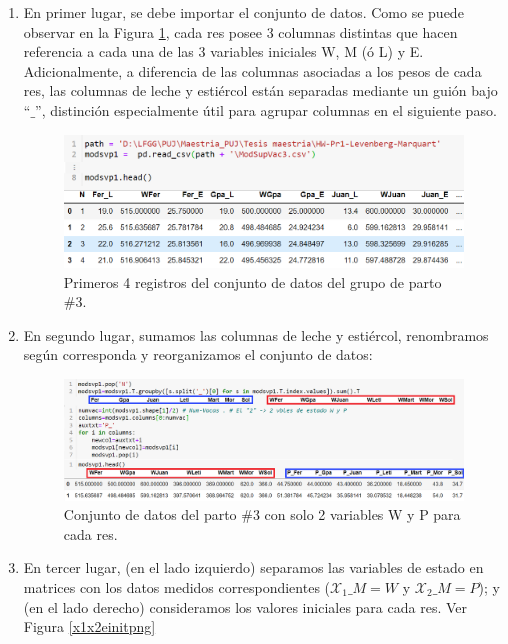 \begin{enumerate}
    \item En primer lugar, se debe importar el conjunto de datos. Como se puede observar en la Figura \ref{agrupmodpng}, cada res posee 3 columnas distintas que hacen referencia a cada una de las 3 variables iniciales W, M (ó L) y E. Adicionalmente, a diferencia de las columnas asociadas a los pesos de cada res, las columnas de leche y estiércol están separadas mediante un guión bajo ``$\_$'', distinción especialmente útil para agrupar columnas en el siguiente paso.
    
        \begin{figure}[H]
            \centering
            \includegraphics[width=\textwidth]{img/Agrupmod.png}
            \caption{Primeros 4 registros del conjunto de datos del grupo de parto \#3.}
            \label{agrupmodpng}
        \end{figure}

    \item En segundo lugar, sumamos las columnas de leche y estiércol, renombramos según corresponda y reorganizamos el conjunto de datos:

        \begin{figure}[H]
            \centering
            \includegraphics[width=\textwidth]{img/Agrupmod2d.png}
            \caption{Conjunto de datos del parto \#3 con solo 2 variables W y P para cada res.}
            \label{agrupmod2dpng}
        \end{figure}

    \item En tercer lugar, (en el lado izquierdo) separamos las variables de estado en matrices con los datos medidos correspondientes ($\mathcal{X}_1\_M=W$ y $\mathcal{X}_2\_M=P$); y (en el lado derecho)  consideramos los valores iniciales para cada res. Ver Figura \ref{x1x2einitpng}


\end{enumerate}
